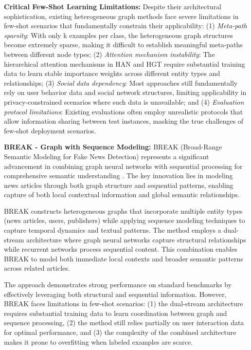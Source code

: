 
\textbf{Critical Few-Shot Learning Limitations:} Despite their architectural sophistication, existing heterogeneous graph methods face severe limitations in few-shot scenarios that fundamentally constrain their applicability: (1) \emph{Meta-path sparsity}: With only k examples per class, the heterogeneous graph structures become extremely sparse, making it difficult to establish meaningful meta-paths between different node types; (2) \emph{Attention mechanism instability}: The hierarchical attention mechanisms in HAN and HGT require substantial training data to learn stable importance weights across different entity types and relationships; (3) \emph{Social data dependency}: Most approaches still fundamentally rely on user behavior data and social network structures, limiting applicability in privacy-constrained scenarios where such data is unavailable; and (4) \emph{Evaluation protocol limitations}: Existing evaluations often employ unrealistic protocols that allow information sharing between test instances, masking the true challenges of few-shot deployment scenarios.

\textbf{BREAK - Graph with Sequence Modeling:} BREAK (Broad-Range Semantic Modeling for Fake News Detection) represents a significant advancement in combining graph neural networks with sequential processing for comprehensive semantic understanding \cite{ji2023break}. The key innovation lies in modeling news articles through both graph structure and sequential patterns, enabling capture of both local contextual information and global semantic relationships.

BREAK constructs heterogeneous graphs that incorporate multiple entity types (news articles, users, publishers) while applying sequence modeling techniques to capture temporal dynamics and textual patterns. The method employs a dual-stream architecture where graph neural networks capture structural relationships while recurrent networks process sequential content. This combination enables BREAK to model both immediate local contexts and broader semantic patterns across related articles.

The approach demonstrates strong performance on standard benchmarks by effectively leveraging both structural and sequential information. However, BREAK faces limitations in few-shot scenarios: (1) the dual-stream architecture requires substantial training data to learn coordination between graph and sequence processing, (2) the method still relies partially on user interaction data for optimal performance, and (3) the complexity of the combined architecture makes it prone to overfitting when labeled examples are scarce.

